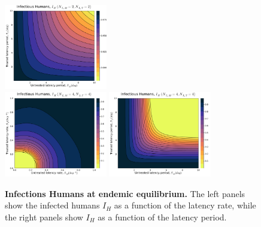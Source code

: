 \documentclass[12pt]{article}
\begin{document}
\begin{figure}[H]
    \includegraphics[width=0.4\textwidth]{../../fig/gen_model/IH_periods_SMxST_2x2.pdf}\\
    \includegraphics[width=0.4\textwidth]{../../fig/gen_model/IH_rates_SMxST_4x4.pdf}
    \includegraphics[width=0.4\textwidth]{../../fig/gen_model/IH_periods_SMxST_4x4.pdf}
    \caption{\textbf{Infections Humans at endemic equilibrium.} The left panels show the infected humans \(I_H\) as a function of the latency rate, while the right panels show \(I_H\) as a function of the latency period.}
\end{figure}
\end{document}
